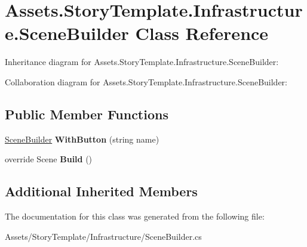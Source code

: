 \hypertarget{classAssets_1_1StoryTemplate_1_1Infrastructure_1_1SceneBuilder}{}\section{Assets.\+Story\+Template.\+Infrastructure.\+Scene\+Builder Class Reference}
\label{classAssets_1_1StoryTemplate_1_1Infrastructure_1_1SceneBuilder}


Inheritance diagram for Assets.\+Story\+Template.\+Infrastructure.\+Scene\+Builder\+:


Collaboration diagram for Assets.\+Story\+Template.\+Infrastructure.\+Scene\+Builder\+:
\subsection*{Public Member Functions}
\begin{DoxyCompactItemize}
\item 
\hyperlink{classAssets_1_1StoryTemplate_1_1Infrastructure_1_1SceneBuilder}{Scene\+Builder} {\bfseries With\+Button} (string name)\hypertarget{classAssets_1_1StoryTemplate_1_1Infrastructure_1_1SceneBuilder_a310d3b241f441b662d8b5c9011ba2aba}{}\label{classAssets_1_1StoryTemplate_1_1Infrastructure_1_1SceneBuilder_a310d3b241f441b662d8b5c9011ba2aba}

\item 
override Scene {\bfseries Build} ()\hypertarget{classAssets_1_1StoryTemplate_1_1Infrastructure_1_1SceneBuilder_ad18f18ef6d289df34307a9494145942c}{}\label{classAssets_1_1StoryTemplate_1_1Infrastructure_1_1SceneBuilder_ad18f18ef6d289df34307a9494145942c}

\end{DoxyCompactItemize}
\subsection*{Additional Inherited Members}


The documentation for this class was generated from the following file\+:\begin{DoxyCompactItemize}
\item 
Assets/\+Story\+Template/\+Infrastructure/Scene\+Builder.\+cs\end{DoxyCompactItemize}
